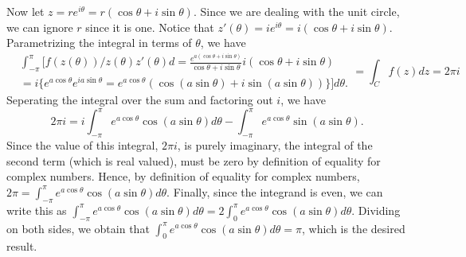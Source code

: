\documentclass{article}
\theoremstyle{definition}
\newcommand{\cs}[1]{\color{blue}{#1}\normalcolor}
\begin{document}
Now let $z = re^{i\theta} = r(\cos\theta + i\sin\theta)$. Since we are dealing with the unit circle, we can ignore $r$ since it is one. Notice that $z'(\theta) = ie^{i\theta} = i(\cos\theta + i\sin\theta)$. Parametrizing the integral in terms of $\theta$, we have $$\begin{array}{cc}
     & \int_{-\pi}^\pi\Big[f(z(\theta))/z(\theta)z'(\theta)d = \frac{e^{a(\cos\theta+i\sin\theta)}}{\cos\theta+i\sin\theta}i(\cos\theta + i\sin\theta) \\
     & =  i\big\{e^{a\cos\theta}e^{ia\sin\theta} = e^{a\cos\theta}(\cos(a\sin\theta) + i\sin(a\sin\theta) )\big\}\Big ]d\theta.
\end{array} = \int_Cf(z)dz = 2\pi i  $$
Seperating the integral over the sum and factoring out $i$, we have
$$2\pi i = i\int_{-\pi}^\pi e^{a\cos\theta}\cos(a\sin\theta)d\theta -\int_{-\pi}^\pi e^{a\cos\theta}\sin(a\sin\theta). $$ Since the value of this integral, $2\pi i$, is purely imaginary, the integral of the second term (which is real valued), must be zero by definition of equality for complex numbers. Hence, by definition of equality for complex numbers, $2\pi = \int_{-\pi}^\pi e^{a\cos\theta}\cos(a\sin\theta)d\theta$. Finally, since the integrand is even, we can write this as $\int_{-\pi}^\pi e^{a\cos\theta}\cos(a\sin\theta)d\theta = 2\int_0^\pi e^{a\cos\theta}\cos(a\sin\theta)d\theta$. Dividing on both sides, we obtain that $\int_0^\pi e^{a\cos\theta}\cos(a\sin\theta)d\theta = \pi$, which is the desired result.

\cs{Whew! 5/5}

\cs{20/20}
\end{document}
